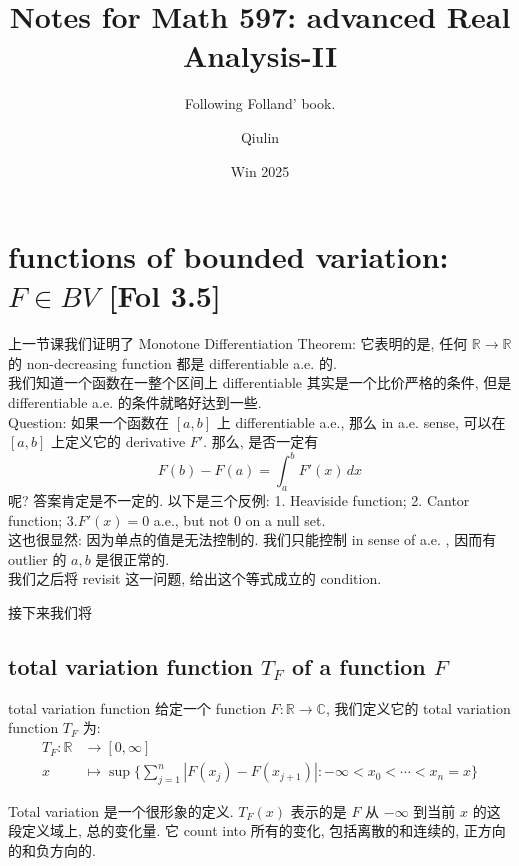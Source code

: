 \documentclass[lang=cn,11pt]{elegantbook}
\title{Notes for Math 597: advanced Real Analysis-II}
\subtitle{Following Folland' book.\cite{folland1999real}}
\author{Qiulin}
\date{Win 2025}
\begin{document}
\maketitle
\frontmatter
\tableofcontents
\mainmatter


\chapter{functions of bounded variation: $F\in BV$ [Fol 3.5]}
上一节课我们证明了 Monotone Differentiation Theorem: 它表明的是, 任何 $\mathbb{R}\to \mathbb{R}$ 的 non-decreasing function 都是 differentiable a.e. 的.\\
我们知道一个函数在一整个区间上 differentiable 其实是一个比价严格的条件, 但是 differentiable a.e. 的条件就略好达到一些.\\
Question: 如果一个函数在 $[a,b] $ 上 differentiable a.e., 那么 in a.e. sense, 可以在 $[a,b] $ 上定义它的 derivative $F'$. 那么, 是否一定有 \[
F(b)  - F(a)  = \int_a^b F'(x) \, dx
\]呢? 答案肯定是不一定的. 以下是三个反例: 1. Heaviside function; 2. Cantor function; 3.$F'(x) = 0$ a.e., but not $0$ on a null set.\\
这也很显然: 因为单点的值是无法控制的. 我们只能控制 in sense of a.e. , 因而有 outlier 的 $a,b$ 是很正常的.\\
我们之后将 revisit 这一问题, 给出这个等式成立的 condition.

接下来我们将


\section{total variation function $T_F$ of a function $F$}
\begin{definition}{total variation function}
    给定一个 function $F:\mathbb{R}\to \mathbb{C}$, 我们定义它的 total variation function $T_F$ 为:\begin{align*}
        T_F : \mathbb{R} &\to [0,\infty]\\
        x &\mapsto \sup \{     \sum_{j=1}^n | F(x_j) - F(x_{j+1})| : -\infty <  x_0 < \cdots < x_n  = x    \} 
    \end{align*}
\end{definition}
\begin{remark}
    Total variation 是一个很形象的定义. $T_F(x)$ 表示的是 $F$ 从 $-\infty$ 到当前 $x$ 的这段定义域上, 总的变化量. 它 count into 所有的变化, 包括离散的和连续的, 正方向的和负方向的.\\
\end{remark}
\end{document}
